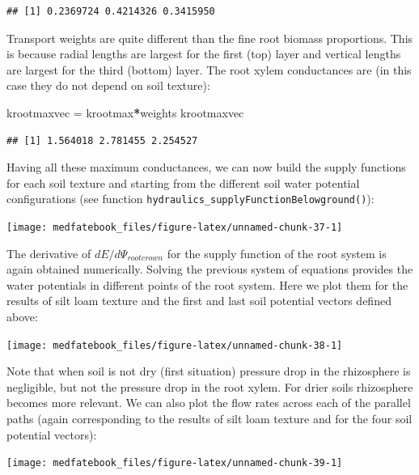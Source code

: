 \documentclass[]{book}
\newenvironment{Shaded}{\begin{snugshade}}{\end{snugshade}}
\newcommand{\StringTok}[1]{\textcolor[rgb]{0.31,0.60,0.02}{#1}}
\newcommand{\OperatorTok}[1]{\textcolor[rgb]{0.81,0.36,0.00}{\textbf{#1}}}
\newcommand{\NormalTok}[1]{#1}
\begin{document}
\begin{verbatim}
## [1] 0.2369724 0.4214326 0.3415950
\end{verbatim}

Transport weights are quite different than the fine root biomass proportions. This is because radial lengths are largest for the first (top) layer and vertical lengths are largest for the third (bottom) layer. The root xylem conductances are (in this case they do not depend on soil texture):

\begin{Shaded}
\begin{Highlighting}[]
\NormalTok{krootmaxvec =}\StringTok{ }\NormalTok{krootmax}\OperatorTok{*}\NormalTok{weights}
\NormalTok{krootmaxvec}
\end{Highlighting}
\end{Shaded}

\begin{verbatim}
## [1] 1.564018 2.781455 2.254527
\end{verbatim}

Having all these maximum conductances, we can now build the supply functions for each soil texture and starting from the different soil water potential configurations (see function \texttt{hydraulics\_supplyFunctionBelowground()}):

\begin{center}\texttt{[image: medfatebook\_files/figure-latex/unnamed-chunk-37-1]} \end{center}

The derivative of \(dE/d\Psi_{rootcrown}\) for the supply function of the root system is again obtained numerically. Solving the previous system of equations provides the water potentials in different points of the root system. Here we plot them for the results of silt loam texture and the first and last soil potential vectors defined above:

\begin{center}\texttt{[image: medfatebook\_files/figure-latex/unnamed-chunk-38-1]} \end{center}

Note that when soil is not dry (first situation) pressure drop in the rhizosphere is negligible, but not the pressure drop in the root xylem. For drier soils rhizosphere becomes more relevant. We can also plot the flow rates across each of the parallel paths (again corresponding to the results of silt loam texture and for the four soil potential vectors):

\begin{center}\texttt{[image: medfatebook\_files/figure-latex/unnamed-chunk-39-1]} \end{center}
\end{document}
